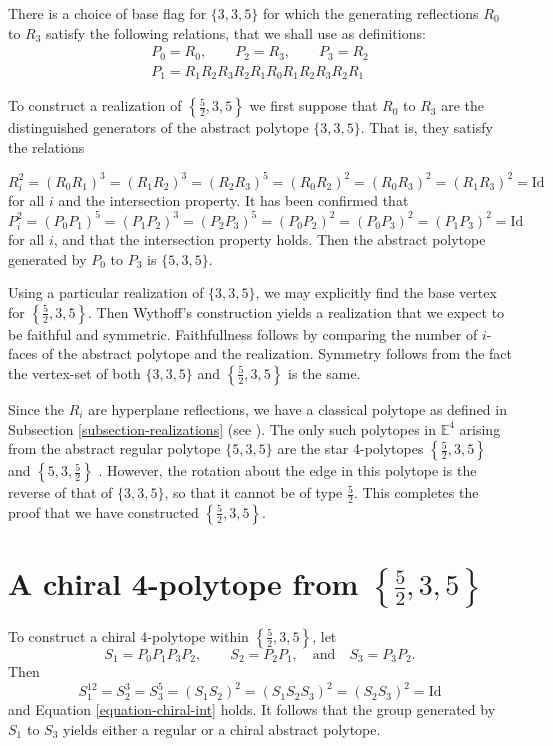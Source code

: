 \documentclass{amsart}
\begin{document}
There is a choice of base flag for $\{3,3,5\}$ for which the generating reflections $R_0$ to $R_3$ satisfy the following relations, that we shall use as definitions:
\begin{gather*}
P_0=R_0,\qquad P_2=R_3,\qquad P_3=R_2\\
P_1=R_1R_2R_3R_2R_1R_0R_1R_2R_3R_2R_1
\end{gather*}

To construct a realization of $\left\{\frac{5}{2},3,5\right\}$ we first suppose
that $R_0$ to $R_3$ are the distinguished generators of the abstract polytope
$\{3,3,5\}$. That is, they satisfy the relations

$$
R_i^2=(R_0R_1)^3=(R_1R_2)^3=(R_2R_3)^5=(R_0R_2)^2=(R_0R_3)^2=(R_1R_3)^2=\text{Id}
$$
for all $i$ and the intersection property. It has been confirmed that
$$
P_i^2=(P_0P_1)^5=(P_1P_2)^3=(P_2P_3)^5=(P_0P_2)^2=(P_0P_3)^2=(P_1P_3)^2=\text{Id}
$$
for all $i$, and that the intersection property holds. 
Then the abstract polytope generated by $P_0$ to $P_3$ is
$\{5,3,5\}$.

Using a particular realization of $\{3,3,5\}$, we may explicitly find the base
vertex for $\left\{\frac{5}{2},3,5\right\}$. Then Wythoff's construction yields
a realization that we expect to be faithful and symmetric. Faithfullness follows
by comparing the number of $i$-faces of the abstract polytope and the
realization. Symmetry follows from the fact the vertex-set of both $\{3,3,5\}$
and $\left\{\frac{5}{2},3,5\right\}$ is the same.
	
Since the $R_i$ are hyperplane reflections, we have a classical polytope as
defined in Subsection \ref{subsection-realizations} (see
\cite{mcmullen-4dimensional}). The only such polytopes in $\mathbb{E}^4$ arising
from the abstract regular polytope $\{5,3,5\}$ are the star 4-polytopes
$\left\{\frac{5}{2},3,5\right\}$ and $\left\{5,3,\frac{5}{2}\right\}$
\cite[Theorem 7D13]{ARP}. However, the rotation about the edge in this polytope
is the reverse of that of $\{3,3,5\}$, so that it cannot be of type
$\frac{5}{2}$. This completes the proof that we have constructed
$\left\{\frac{5}{2},3,5\right\}$.
	
\section{A chiral 4-polytope from $\left\{\frac{5}{2},3,5\right\}$}
\label{section-a-chiral-4-polytope-from-52-3-5}

To construct a chiral 4-polytope within $\left\{\frac{5}{2},3,5\right\}$, let
$$
S_1=P_0P_1P_3P_2,\qquad S_2=P_2P_1,\quad\text{and}\quad S_3=P_3P_2.
$$
Then
\begin{equation}
\label{equation-string-chiral}
S_1^{12}=S_2^3=S_3^5=(S_1S_2)^2=(S_1S_2S_3)^2=(S_2S_3)^2=\text{Id}
\end{equation}
and Equation \ref{equation-chiral-int} holds. It follows that
the group generated by $S_1$ to $S_3$ yields either a regular or a chiral
abstract polytope.
	
\end{document}
